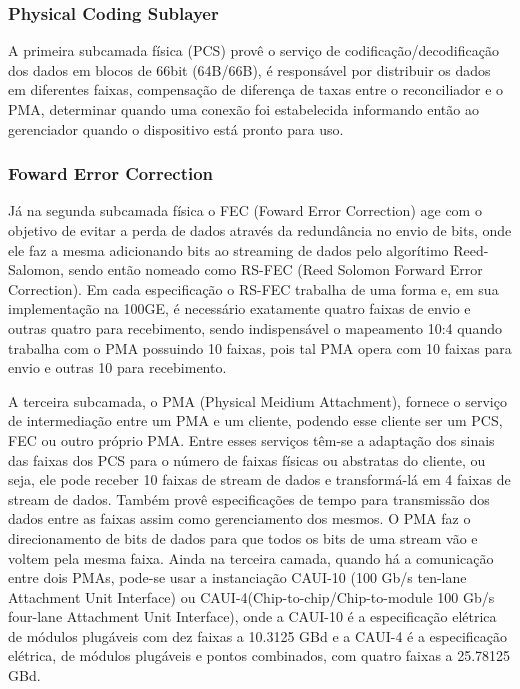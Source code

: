 \documentclass[a4paper,12pt]{article}
\begin{document}
\subsubsection{Physical Coding Sublayer}
A primeira subcamada física (PCS) provê o serviço de codificação/decodificação dos dados em blocos de 66bit (64B/66B), é responsável por distribuir os dados em diferentes faixas, compensação de diferença de taxas entre o reconciliador e o PMA, determinar quando uma conexão foi estabelecida informando então ao gerenciador quando o dispositivo está pronto para uso. 


\subsubsection{Foward Error Correction}
Já na segunda subcamada física o FEC (Foward Error Correction) age com o objetivo de evitar a perda de dados através da redundância no envio de bits, onde ele faz a mesma adicionando bits ao streaming de dados pelo algorítimo Reed-Salomon, sendo então nomeado como RS-FEC (Reed Solomon Forward Error Correction). Em cada especificação o RS-FEC trabalha de uma forma e, em sua implementação na 100GE, é necessário exatamente quatro faixas de envio e outras quatro para recebimento, sendo indispensável o mapeamento 10:4 quando trabalha com o PMA possuindo 10 faixas, pois tal PMA opera com 10 faixas para envio e outras 10 para recebimento.

A terceira subcamada, o PMA (Physical Meidium Attachment), fornece o serviço de intermediação entre um PMA e um cliente, podendo esse cliente ser um PCS, FEC ou outro próprio PMA. Entre esses serviços têm-se a adaptação dos sinais das faixas dos PCS para o número de faixas físicas ou abstratas do cliente, ou seja, ele pode receber 10 faixas de stream de dados e transformá-lá em 4 faixas de stream de dados. Também provê especificações de tempo para transmissão dos dados entre as faixas assim como gerenciamento dos mesmos. O PMA faz o direcionamento de bits de dados para que todos os bits de uma stream vão e voltem pela mesma faixa. Ainda na terceira camada, quando há a comunicação entre dois PMAs, pode-se usar a instanciação CAUI-10 (100 Gb/s ten-lane Attachment Unit Interface) ou CAUI-4(Chip-to-chip/Chip-to-module 100 Gb/s four-lane Attachment Unit Interface), onde a CAUI-10 é a especificação elétrica de módulos plugáveis com dez faixas a 10.3125 GBd e a CAUI-4 é a especificação elétrica, de módulos plugáveis e pontos combinados, com quatro faixas a 25.78125 GBd.
\end{document}
